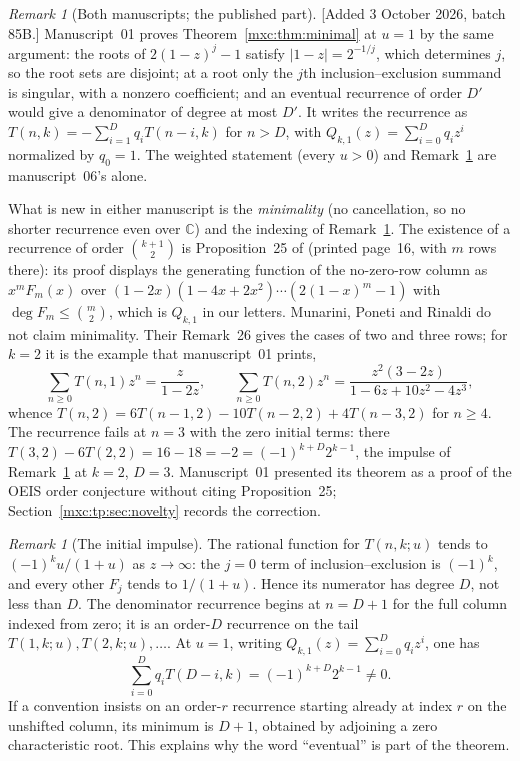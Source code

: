 \documentclass[11pt]{article}
\numberwithin{equation}{section}
\theoremstyle{definition}
\theoremstyle{remark}
\newtheorem{remark}[theorem]{Remark}
\begin{document}
\begin{remark}[Both manuscripts; the published part]\label{mxc:rem:minimal-sources}
[Added 3 October 2026, batch 85B.] Manuscript~01 proves
Theorem~\ref{mxc:thm:minimal} at $u=1$ by the same argument: the roots of
$2(1-z)^j-1$ satisfy $|1-z|=2^{-1/j}$, which determines $j$, so the root
sets are disjoint; at a root only the $j$th inclusion--exclusion summand
is singular, with a nonzero coefficient; and an eventual recurrence of
order $D'$ would give a denominator of degree at most $D'$. It writes the
recurrence as $T(n,k)=-\sum_{i=1}^{D}q_iT(n-i,k)$ for $n>D$, with
$Q_{k,1}(z)=\sum_{i=0}^Dq_iz^i$ normalized by $q_0=1$. The weighted
statement (every $u>0$) and Remark~\ref{mxc:rem:impulse} are manuscript~06's
alone.

What is new in either manuscript is the \emph{minimality} (no
cancellation, so no shorter recurrence even over $\mathbb C$) and the
indexing of Remark~\ref{mxc:rem:impulse}. The existence of a recurrence of
order $\binom{k+1}{2}$ is Proposition~25 of \cite{mpr2009} (printed
page~16, with $m$ rows there): its proof displays the generating function
of the no-zero-row column as $x^mF_m(x)$ over
$(1-2x)(1-4x+2x^2)\cdots(2(1-x)^m-1)$ with $\deg F_m\le\binom m2$, which is
$Q_{k,1}$ in our letters. Munarini, Poneti and Rinaldi do not claim
minimality. Their Remark~26 gives the cases of two and three rows; for
$k=2$ it is the example that manuscript~01 prints,
\begin{equation}\label{mxc:eq:smallexamples}
 \sum_{n\ge0}T(n,1)z^n=\frac{z}{1-2z},\qquad
 \sum_{n\ge0}T(n,2)z^n=\frac{z^2(3-2z)}{1-6z+10z^2-4z^3},
\end{equation}
whence $T(n,2)=6T(n-1,2)-10T(n-2,2)+4T(n-3,2)$ for $n\ge4$. The
recurrence fails at $n=3$ with the zero initial terms: there
$T(3,2)-6T(2,2)=16-18=-2=(-1)^{k+D}2^{k-1}$, the impulse of
Remark~\ref{mxc:rem:impulse} at $k=2$, $D=3$. Manuscript~01 presented its
theorem as a proof of the OEIS order conjecture without citing
Proposition~25; Section~\ref{mxc:tp:sec:novelty} records the correction.
\end{remark}

\begin{remark}[The initial impulse]\label{mxc:rem:impulse}
The rational function for $T(n,k;u)$ tends to $(-1)^k u/(1+u)$ as
$z\to\infty$: the $j=0$ term of inclusion--exclusion is $(-1)^k$,
and every other $F_j$ tends to $1/(1+u)$. Hence its numerator has
degree $D$, not less than $D$. The denominator recurrence begins at
$n=D+1$ for the full column indexed from zero; it is an order-$D$
recurrence on the tail $T(1,k;u),T(2,k;u),\ldots$.
At $u=1$, writing $Q_{k,1}(z)=\sum_{i=0}^D q_i z^i$, one has
\[
 \sum_{i=0}^D q_iT(D-i,k)=(-1)^{k+D}2^{k-1}\ne0.
\]
If a convention insists on an order-$r$ recurrence starting already at
index $r$ on the unshifted column, its minimum is $D+1$, obtained by
adjoining a zero characteristic root. This explains why the word
``eventual'' is part of the theorem.
\end{remark}
\end{document}

